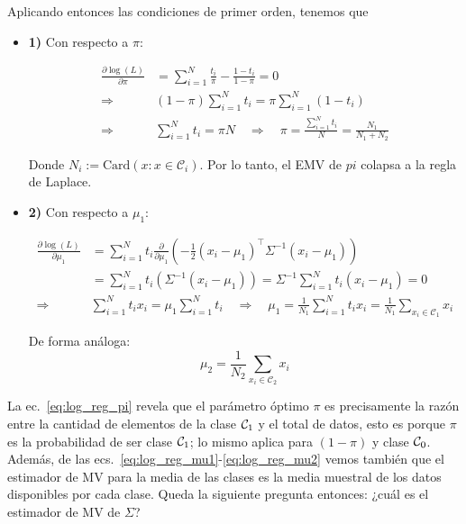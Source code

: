 Aplicando entonces las condiciones de primer orden, tenemos que 
\begin{itemize}
	
\item \textbf{1)} Con respecto a $\pi$:
	
	\begin{align}
	\frac{\partial\log(L)}{\partial\pi} &= \sum_{i=1}^N \frac{t_i}{\pi}-\frac{1-t_i}{1-\pi}=0\nonumber\\
	\Rightarrow \quad & (1-\pi)\sum_{i=1}^Nt_i = \pi\sum_{i=1}^N(1-t_i)\nonumber\\
	\Rightarrow \quad & \sum_{i=1}^Nt_i=\pi N \quad\Rightarrow\quad \pi = \frac{\sum_{i=1}^Nt_i}{N} = \frac{N_1}{N_1+N_2} \label{eq:log_reg_pi}
	\end{align}
	
	Donde $N_i:=\text{Card}(x:x\in\mathcal{C}_i)$. Por lo tanto, el EMV de $pi$ colapsa a la regla de Laplace.
	
\item \textbf{2)} Con respecto a $\mu_1$:
	
	\begin{align}
	\frac{\partial\log(L)}{\partial\mu_1} &= \sum_{i=1}^N t_i
	\frac{\partial}{\partial \mu_1}(-\frac{1}{2}(x_i-\mu_1)^\top \Sigma^{-1}(x_i-\mu_1))\nonumber\\
	&= \sum_{i=1}^N t_i(\Sigma^{-1}(x_i-\mu_1)) =
	\Sigma^{-1}\sum_{i=1}^N t_i(x_i-\mu_1) = 0\nonumber\\
	\Rightarrow\quad & \sum_{i=1}^Nt_ix_i= \mu_1\sum_{i=1}^N t_i
	\quad\Rightarrow\quad \mu_1  = \frac{1}{N_1}\sum_{i=1}^Nt_ix_i = \frac{1}{N_1}\sum_{x_i\in \mathcal{C}_1}x_i \label{eq:log_reg_mu1}
	\end{align}
	
	De forma análoga:
	\begin{equation}
	\mu_2 = \frac{1}{N_2}\sum_{x_i\in \mathcal{C}_2}x_i \label{eq:log_reg_mu2}
	\end{equation}
	
\end{itemize}

\begin{remark}\label{rem:log_reg_interpretacion_ML}
La ec.~\eqref{eq:log_reg_pi} revela que el parámetro  óptimo $\pi$ es precisamente la razón entre la cantidad de elementos de la clase ${\mathcal C}_1$ y el total de datos, esto es porque $\pi$ es la probabilidad de ser clase ${\mathcal C}_1$; lo mismo aplica para $(1-\pi)$ y clase ${\mathcal C}_0$. Además, de las ecs.~\eqref{eq:log_reg_mu1}-\eqref{eq:log_reg_mu2} vemos también que el estimador de MV para la media de las clases es la media muestral de los datos disponibles por cada clase. Queda la siguiente pregunta entonces: ¿cuál es el estimador de MV de $\Sigma$?
\end{remark}

